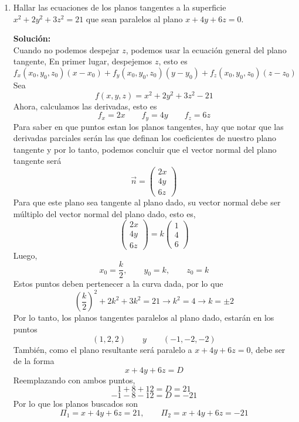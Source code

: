 \documentclass[12pt]{article}
\newenvironment{solucion}
{\begin{mdframed}[backgroundcolor=black!10]
		{\bf Solución:}\\
	}
	{
	\end{mdframed}
}
\newenvironment{preguntas}
{\begin{enumerate}\itemsep12pt
	}
	{
	\end{enumerate}
}
\newcommand{\ra}{\rightarrow}
\begin{document}
\begin{preguntas}
\begin{solucion}
Recordemos que el plano tangente viene dado por
$$z - z_0 = f_x(x_0, y_0)(x-x_0) + f_y(x_0,y_0)(y-y_0)$$
Notemos que
$$f_x(x,y) = -\dfrac{1}{2}y\sin\left(\dfrac{x}{2}\right) \qquad f(\pi, 1) = -\dfrac{1}{2}$$
$$f_y(x,y) = \cos\left(\dfrac{x}{2}\right) \qquad f(\pi, 1) = 0$$
Luego,
$$z = -\dfrac{1}{2}(x-\pi) \ra 2z + x = \pi$$
Donde $\Pi: 2z + x = \pi$ corresponde al plano tangente.
\end{solucion}
\item Hallar las ecuaciones de los planos tangentes a la superficie $x^2 + 2y^2 + 3z^2 = 21$ que sean paralelos al plano $x + 4y + 6z = 0$.
\begin{solucion}
Cuando no podemos despejar $z$, podemos usar la ecuación general del plano tangente,
En primer lugar, despejemos $z$, esto es
$$f_x(x_0,y_0,z_0)(x-x_0) +f_y(x_0,y_0,z_0)(y-y_0) + f_z(x_0,y_0,z_0)(z-z_0)$$
Sea 
$$f(x,y,z) = x^2 + 2y^2 + 3z^2 -21$$
Ahora, calculamos las derivadas, esto es
$$f_x = 2x \qquad f_y = 4y \qquad f_z = 6z$$
Para saber en que puntos estan los planos tangentes, hay que notar que las derivadas parciales serán las que definan los coeficientes de nuestro plano tangente y por lo tanto, podemos concluir que el vector normal del plano tangente será
$$\vec{n} = \begin{pmatrix}2x \\ 4y\\ 6z\end{pmatrix}$$
Para que este plano sea tangente al plano dado, su vector normal debe ser múltiplo del vector normal del plano dado, esto es,
$$\begin{pmatrix}2x \\ 4y\\ 6z\end{pmatrix} = k \begin{pmatrix}1 \\ 4\\ 6\end{pmatrix}$$
Luego,
$$x_0 = \dfrac{k}{2}, \qquad y_0 = k, \qquad z_0 = k$$
Estos puntos deben pertenecer a la curva dada, por lo que
$$\left(\dfrac{k}{2}\right)^2 + 2k^2 + 3k^2 = 21\ra k^2 = 4 \ra k = \pm 2$$
Por lo tanto, los planos tangentes paralelos al plano dado, estarán en los puntos
$$(1,2,2) \qquad y \qquad (-1,-2,-2)$$
También, como el plano resultante será paralelo a $x + 4y + 6z= 0$, debe ser de la forma
$$x + 4y + 6z = D$$
Reemplazando con ambos puntos,
$$1 + 8 + 12 = D = 21$$
$$-1 - 8 - 12 = D = -21$$
Por lo que los planos buscados son
$$\Pi_1 = x + 4y + 6z = 21, \qquad \Pi_2 = x + 4y + 6z = -21$$

\end{solucion}
\end{preguntas}
\end{document}
